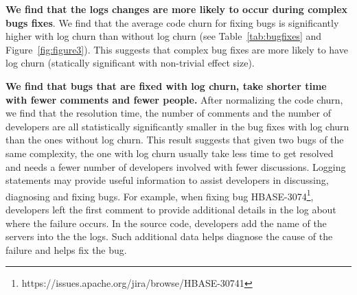 \textbf{We find that the logs changes are more likely to occur during complex bugs fixes}. We find that the average code churn for fixing bugs is significantly higher with log churn than without log churn (see Table~\ref{tab:bugfixes} and Figure~\ref{fig:figure3}). This suggests that complex bug fixes are more likely to have log churn (statically significant with non-trivial effect size). 




\textbf{We find that bugs that are fixed with log churn, take shorter time with fewer comments and fewer people.} After normalizing the code churn, we find that the resolution time, the number of comments and the number of developers are all statistically significantly smaller in the bug fixes with log churn than the ones without log churn. This result suggests that given two bugs of the same complexity, the one with log churn usually take less time to get resolved and needs a fewer number of developers involved with fewer discussions. Logging statements may provide useful information to assist developers in discussing, diagnosing and fixing bugs. For example, when fixing bug HBASE-3074\footnote{https://issues.apache.org/jira/browse/HBASE-30741}, developers left the first comment to provide additional details in the log about where the failure occurs. In the source code, developers add the name of the servers into the the logs. Such additional data helps diagnose the cause of the failure and helps fix the bug.





